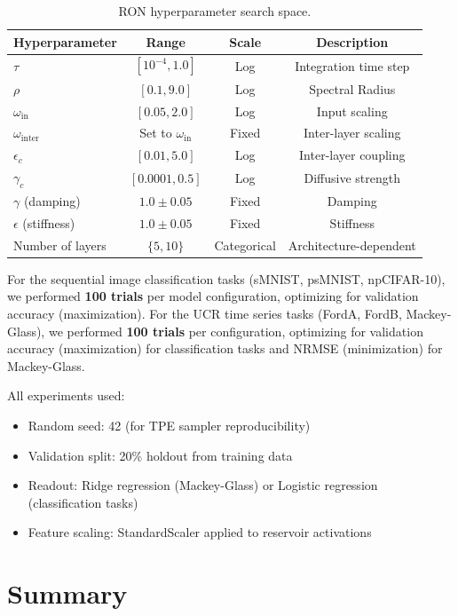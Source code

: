 \begin{table}[ht!]
\centering
\caption{RON hyperparameter search space.}
\label{tab:ron_hyperparams}
\begin{tabular}{@{}lccc@{}}
\toprule
\textbf{Hyperparameter} & \textbf{Range} & \textbf{Scale} & \textbf{Description} \\
\midrule
$\tau$ & $[10^{-4}, 1.0]$ & Log & Integration time step \\
$\rho$ & $[0.1, 9.0]$ & Log & Spectral Radius \\
$\omega_{\text{in}}$ & $[0.05, 2.0]$ & Log & Input scaling \\
$\omega_{\text{inter}}$ & Set to $\omega_{\text{in}}$ & Fixed & Inter-layer scaling \\
$\epsilon_c$ & $[0.01, 5.0]$ & Log & Inter-layer coupling \\
$\gamma_c$ & $[0.0001, 0.5]$ & Log & Diffusive strength \\
$\gamma$ (damping) & $1.0 \pm 0.05$ & Fixed &  Damping  \\
$\epsilon$ (stiffness) & $1.0 \pm 0.05$ & Fixed &  Stiffness \\
Number of layers & $\{5, 10\}$ & Categorical & Architecture-dependent \\
\bottomrule
\end{tabular}
\end{table}


For the sequential image classification tasks (sMNIST, psMNIST, npCIFAR-10), we performed \textbf{100 trials} per model configuration, optimizing for validation accuracy (maximization). For the UCR time series tasks (FordA, FordB, Mackey-Glass), we performed \textbf{100 trials} per configuration, optimizing for validation accuracy (maximization) for classification tasks and NRMSE (minimization) for Mackey-Glass.

All experiments used:
\begin{itemize}
    \item Random seed: 42 (for TPE sampler reproducibility)
    \item Validation split: 20\% holdout from training data
    \item Readout: Ridge regression (Mackey-Glass) or Logistic regression (classification tasks)
    \item Feature scaling: StandardScaler applied to reservoir activations
\end{itemize}

\section{Summary}